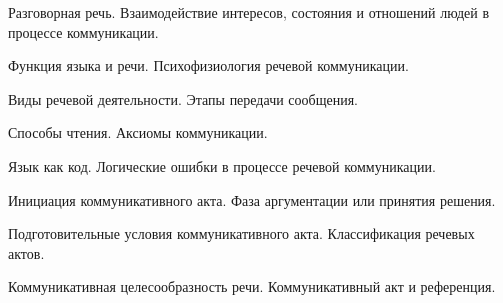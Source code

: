 \documentclass[
	14pt,
	a4paper,
	]
	{scrartcl}
\begin{document}
\vfill

\newpage


\shapk
{}
\setcounter{zad}{0}

\vfill
\z Разговорная речь.
 \vfill
\z Взаимодействие интересов, состояния и отношений людей в процессе коммуникации.
 \vfill

\vfill

\newpage


\shapk
{}
\setcounter{zad}{0}

\vfill
\z Функция языка и речи.
 \vfill
\z Психофизиология речевой коммуникации.
 \vfill

\vfill

\newpage


\shapk
{}
\setcounter{zad}{0}

\vfill
\z Виды речевой деятельности.
 \vfill
\z Этапы передачи сообщения.
 \vfill

\vfill

\newpage


\shapk
{}
\setcounter{zad}{0}

\vfill
\z Способы чтения.
 \vfill
\z Аксиомы коммуникации.
 \vfill

\vfill

\newpage


\shapk
{}
\setcounter{zad}{0}

\vfill
\z Язык как код.
 \vfill
\z Логические ошибки в процессе речевой коммуникации.
 \vfill

\vfill

\newpage


\shapk
{}
\setcounter{zad}{0}

\vfill
\z Инициация коммуникативного акта.
 \vfill
\z Фаза аргументации или принятия решения.
 \vfill

\vfill

\newpage


\shapk
{}
\setcounter{zad}{0}

\vfill
\z Подготовительные условия коммуникативного акта.
 \vfill
\z Классификация речевых актов.
 \vfill

\vfill

\newpage


\shapk
{}
\setcounter{zad}{0}

\vfill
\z Коммуникативная целесообразность речи.
 \vfill
\z Коммуникативный акт и референция.
 \vfill
\end{document}
